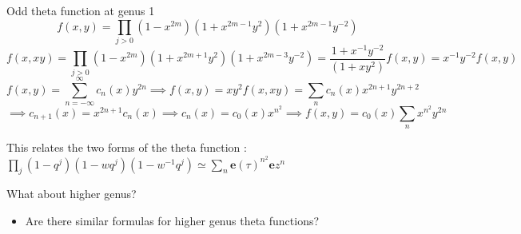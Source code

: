 \documentclass[11pt,aspectratio=169]{beamer}
\newcommand{\ee}[0]{\mathbf{e}}
\begin{document}
\begin{frame}{Odd theta function at genus 1}
    \[f(x,y) = \prod_{j>0} (1-x^{2m})(1+x^{2m-1}y^2)(1+x^{2m-1}y^{-2})\]
    \[f(x,xy) = \prod_{j>0} (1-x^{2m})(1+x^{2m+1}y^2)(1+x^{2m-3}y^{-2}) = \frac{1+x^{-1}y^{-2}}{(1+xy^2)}f(x,y) = x^{-1}y^{-2}f(x,y)\]
    \[f(x,y) = \sum_{n=-\infty}^\infty c_n(x) y^{2n} \implies f(x,y) = xy^2 f(x,xy) = \sum_n c_n(x) x^{2n+1}y^{2n+2}\]
    \[\implies c_{n+1}(x) = x^{2n+1}c_n(x) \implies c_{n}(x) = c_0(x) x^{n^2} \implies f(x,y) = c_0(x) \sum_n x^{n^2} y^{2n}\]

    This relates the two forms of the theta function : $\prod_j (1-q^j) (1-wq^j)(1-w^{-1}q^j) \simeq \sum_n \ee(\tau)^{n^2} \ee{z}^{n}$

    {
        \begin{block}{What about higher genus?}
            \begin{itemize}
                \item Are there similar formulas for higher genus theta functions?
            \end{itemize}
        \end{block}
    }
\end{frame}
\end{document}
